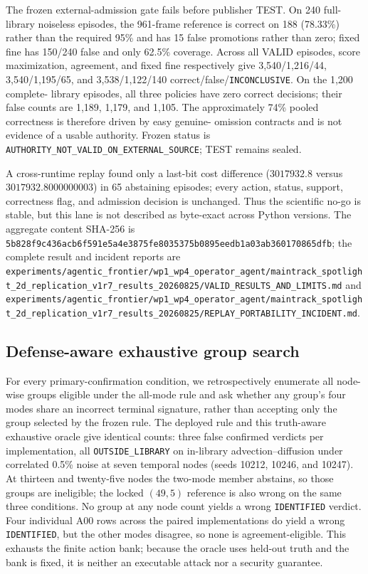 \documentclass{article}
\newcommand{\ID}{\texttt{IDENTIFIED}\xspace}
\newcommand{\OUT}{\texttt{OUTSIDE\_LIBRARY}\xspace}
\newcommand{\INC}{\texttt{INCONCLUSIVE}\xspace}
\begin{document}
The frozen external-admission gate fails before publisher TEST. On 240 full-library noiseless
episodes, the 961-frame reference is correct on 188 (78.33\%) rather than the required 95\% and
has 15 false promotions rather than zero; fixed fine has 150/240 false and only 62.5\% coverage.
Across all VALID episodes, score maximization, agreement, and fixed fine respectively give
3,540/1,216/44, 3,540/1,195/65, and 3,538/1,122/140 correct/false/\INC. On the 1,200 complete-
library episodes, all three policies have zero correct decisions; their false counts are 1,189,
1,179, and 1,105. The approximately 74\% pooled correctness is therefore driven by easy genuine-
omission contracts and is not evidence of a usable authority. Frozen status is
\texttt{AUTHORITY\_NOT\_VALID\_ON\_EXTERNAL\_SOURCE}; TEST remains sealed.

A cross-runtime replay found only a last-bit cost difference
($3017932.8$ versus $3017932.8000000003$) in 65 abstaining episodes; every action, status,
support, correctness flag, and admission decision is unchanged. Thus the scientific no-go is
stable, but this lane is not described as byte-exact across Python versions. The aggregate content
SHA-256 is \nolinkurl{5b828f9c436acb6f591e5a4e3875fe8035375b0895eedb1a03ab360170865dfb};
the complete result and incident reports are
\nolinkurl{experiments/agentic_frontier/wp1_wp4_operator_agent/maintrack_spotlight_2d_replication_v1r7_results_20260825/VALID_RESULTS_AND_LIMITS.md}
and \nolinkurl{experiments/agentic_frontier/wp1_wp4_operator_agent/maintrack_spotlight_2d_replication_v1r7_results_20260825/REPLAY_PORTABILITY_INCIDENT.md}.

\subsection{Defense-aware exhaustive group search}
\label{sec:defense-aware-group-search}
For every primary-confirmation condition, we retrospectively enumerate all node-wise groups eligible
under the all-mode rule and ask whether any group's four modes share an incorrect terminal signature,
rather than accepting only the group selected by the frozen rule. The deployed rule and this
truth-aware exhaustive oracle give identical counts: three false confirmed verdicts per implementation,
all \OUT on in-library advection--diffusion under correlated 0.5\% noise at seven temporal nodes
(seeds 10212, 10246, and 10247). At thirteen and twenty-five nodes the two-mode member abstains, so
those groups are ineligible; the locked $(49,5)$ reference is also wrong on the same three conditions.
No group at any node count yields a wrong \ID verdict. Four individual A00 rows across the paired
implementations do yield a wrong \ID, but the other modes disagree, so none is agreement-eligible.
This exhausts the finite action bank; because the oracle uses held-out truth and the bank is fixed,
it is neither an executable attack nor a security guarantee.
\end{document}
